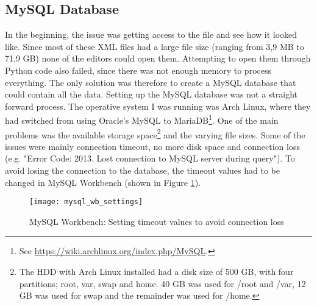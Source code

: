 \subsection{MySQL Database}
In the beginning, the issue was getting access to the file and see how it looked like. 
Since most of these XML files had a large file size (ranging from 3,9 MB to 71,9 GB) none of the editors could open them. 
Attempting to open them through Python code also failed, since there was not enough memory to process everything. 
The only solution was therefore to create a MySQL database that could contain all the data. 
\vspace{0.5em}\newline
Setting up the MySQL database was not a straight forward process. 
The operative system I was running was Arch Linux, where they had switched from using Oracle's MySQL to 
MariaDB\footnote{
	See \url{https://wiki.archlinux.org/index.php/MySQL}.
	}. 
One of the main problems was the available storage space\footnote{
	The HDD with Arch Linux installed had a disk size of 500 GB, with four partitions; root, var, swap and home. 
	40 GB was used for /root and /var, 12 GB was used for swap and the remainder was used for /home.
	} 
and the varying file sizes. 
Some of the issues were mainly connection timeout, no more disk space and connection loss (e.g. "Error Code: 2013. Lost connection to MySQL server during query"). 
To avoid losing the connection to the database, the timeout values had to be changed in MySQL Workbench (shown in Figure \ref{fig:mysql_wb_settings}).
\begin{figure}[ht]
	\centering
	\texttt{[image: mysql\_wb\_settings]}
	\caption{MySQL Workbench: Setting timeout values to avoid connection loss}
	\label{fig:mysql_wb_settings}
\end{figure}

